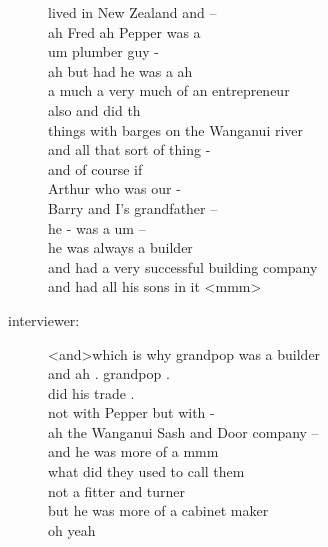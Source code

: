 \documentclass{article}
\newcommand{\turn}[2]{
\item[#1:] #2
}
\begin{document}
\begin{description}
{lived in New Zealand and --\\
ah Fred ah Pepper was a\\
um plumber guy -\\
ah but had he was a ah\\
a much a very much of an entrepreneur\\
also and did th\\
things with barges on the Wanganui river\\
and all that sort of thing -\\
and of course if\\
Arthur who was our -\\
Barry and I's grandfather --\\
he - was a um --\\
he was always a builder\\
and had a very successful building company\\
and had all his sons in it \textless mmm\textgreater }

\turn{interviewer}{\textless and\textgreater  which is why grandpop was a builder\\
and ah . grandpop .\\
did his trade .\\
not with Pepper but with -\\
ah the Wanganui Sash and Door company --\\
and he was more of a mmm\\
what did they used to call them\\
not a fitter and turner\\
but he was more of a cabinet maker\\
oh yeah}


\end{description}
\end{document}
